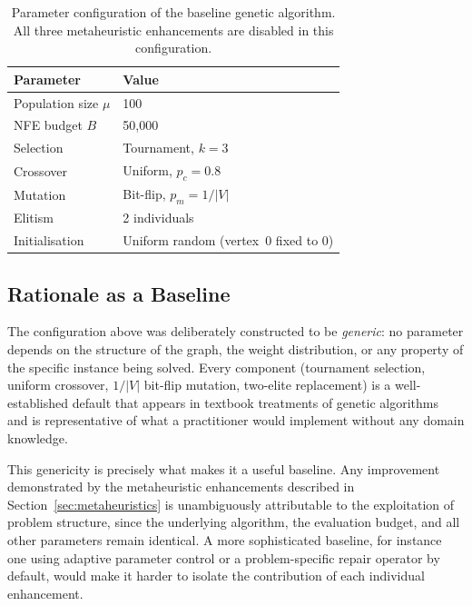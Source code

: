 \documentclass[12pt]{article}
\begin{document}
\begin{table}[H]
    \centering
    \begin{tabularx}{0.75\textwidth}{|l|X|}
        \toprule
        \textbf{Parameter} & \textbf{Value} \\
        \midrule
        Population size $\mu$       & 100 \\
        NFE budget $B$              & 50{,}000 \\
        Selection                   & Tournament, $k = 3$ \\
        Crossover                   & Uniform, $p_c = 0.8$ \\
        Mutation                    & Bit-flip, $p_m = 1/|V|$ \\
        Elitism                     & 2 individuals \\
        Initialisation              & Uniform random (vertex~0 fixed to 0) \\
        \bottomrule
    \end{tabularx}
    \caption{Parameter configuration of the baseline genetic algorithm.
             All three metaheuristic enhancements are disabled in this configuration.}
    \label{tab:baseline}
\end{table}

\subsection{Rationale as a Baseline}

The configuration above was deliberately constructed to be \emph{generic}: no
parameter depends on the structure of the graph, the weight distribution, or any
property of the specific instance being solved.
Every component (tournament selection, uniform crossover, $1/|V|$ bit-flip mutation,
two-elite replacement) is a well-established default that appears in textbook
treatments of genetic algorithms~\cite{dejong,goldberg} and is representative of
what a practitioner would implement without any domain knowledge.

This genericity is precisely what makes it a useful baseline.
Any improvement demonstrated by the metaheuristic enhancements described in
Section~\ref{sec:metaheuristics} is unambiguously attributable to the exploitation
of problem structure, since the underlying algorithm, the evaluation budget, and
all other parameters remain identical.
A more sophisticated baseline, for instance one using adaptive parameter control or
a problem-specific repair operator by default, would make it harder to isolate the
contribution of each individual enhancement.
\end{document}
